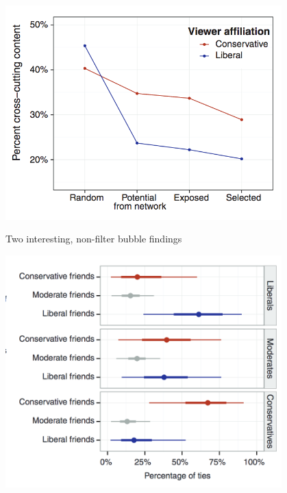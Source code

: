 \documentclass[aspectratio=169]{beamer}
\begin{document}
\begin{frame}

\begin{center}
\includegraphics[width=0.8\textwidth]{figures/bakshy_exposure_2015_fig3b}
\end{center}

\end{frame}
\begin{frame}

Two interesting, non-filter bubble findings

\end{frame}
\begin{frame}

\begin{center}
\includegraphics[width=0.80\textwidth]{figures/bakshy_exposure_2015_fig2}
\end{center}

\end{frame}
\end{document}
